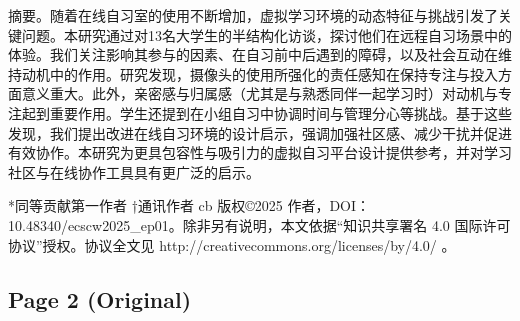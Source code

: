 \documentclass[12pt]{ctexart}
\begin{document}
摘要。随着在线自习室的使用不断增加，虚拟学习环境的动态特征与挑战引发了关键问题。本研究通过对13名大学生的半结构化访谈，探讨他们在远程自习场景中的体验。我们关注影响其参与的因素、在自习前中后遇到的障碍，以及社会互动在维持动机中的作用。研究发现，摄像头的使用所强化的责任感知在保持专注与投入方面意义重大。此外，亲密感与归属感（尤其是与熟悉同伴一起学习时）对动机与专注起到重要作用。学生还提到在小组自习中协调时间与管理分心等挑战。基于这些发现，我们提出改进在线自习环境的设计启示，强调加强社区感、减少干扰并促进有效协作。本研究为更具包容性与吸引力的虚拟自习平台设计提供参考，并对学习社区与在线协作工具具有更广泛的启示。

*同等贡献第一作者
†通讯作者
cb
版权©2025 作者，DOI：10.48340/ecscw2025\_ep01。除非另有说明，本文依据“知识共享署名 4.0 国际许可协议”授权。协议全文见 http://creativecommons.org/licenses/by/4.0/ 。


\subsection*{Page 2 (Original)}
\end{document}
